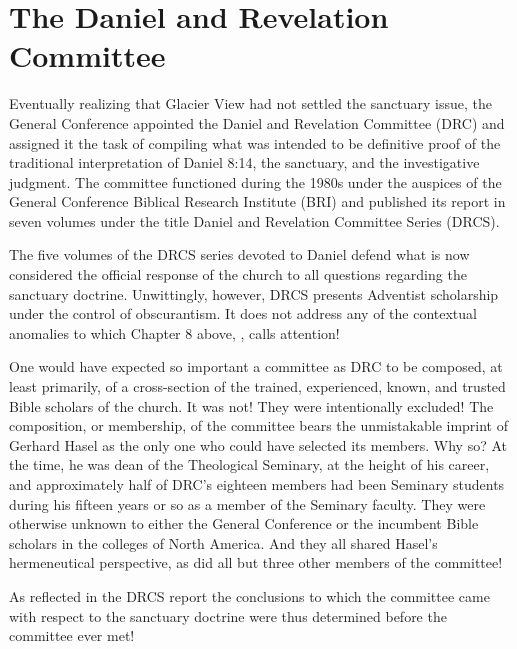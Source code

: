\chapter{The Daniel and Revelation Committee}
\label{ch:committee}

Eventually realizing that Glacier View had not settled the sanctuary issue,
the General Conference appointed the Daniel and Revelation Committee (DRC)
and assigned it the task of compiling what was intended to be definitive 
proof of the traditional interpretation of Daniel 8:14, the sanctuary, and
the investigative judgment. The committee functioned during the 1980s under
the auspices of the General Conference Biblical Research Institute (BRI) and
published its report in seven volumes under the title Daniel and Revelation
Committee Series (DRCS).

The five volumes of the DRCS series devoted to Daniel defend what is now
considered the official response of the church to all questions regarding
the sanctuary doctrine. Unwittingly, however, DRCS presents Adventist
scholarship under the control of obscurantism. It does not address any of
the contextual anomalies to which Chapter 8 above, ,
calls attention!

One would have expected so important a committee as DRC to be composed, at
least primarily, of a cross-section of the trained, experienced, known, and
trusted Bible scholars of the church. It was not! They were intentionally
excluded! The composition, or membership, of the committee bears the
unmistakable imprint of Gerhard Hasel as the only one who could have
selected its members. Why so? At the time, he was dean of the Theological
Seminary, at the height of his career, and approximately half of DRC's
eighteen members had been Seminary students during his fifteen years or so
as a member of the Seminary faculty. They were otherwise unknown to either
the General Conference or the incumbent Bible scholars in the colleges of
North America. And they all shared Hasel's hermeneutical perspective, as did
all but three other members of the committee!

As reflected in the DRCS report the conclusions to which the committee came
with respect to the sanctuary doctrine were thus determined before the
committee ever met!

